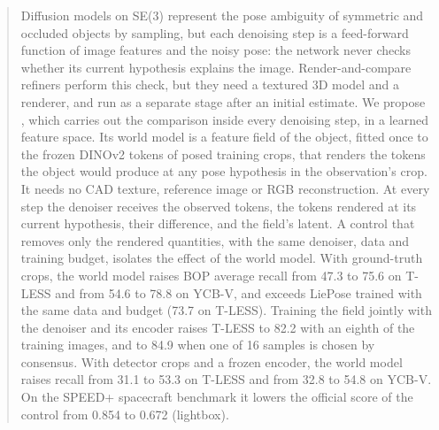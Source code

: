 \begin{abstract}
Diffusion models on SE(3) represent the pose ambiguity of symmetric and occluded objects by sampling, but each denoising step is a
feed-forward function of image features and the noisy pose: the network never checks whether its current hypothesis explains the
image. Render-and-compare refiners perform this check, but they need a textured 3D model and a renderer, and run as a separate stage
after an initial estimate. We propose \method, which carries out the comparison inside every denoising step, in a learned feature
space. Its world model is a feature field of the object, fitted once to the frozen DINOv2 tokens of posed training crops, that renders
the tokens the object would produce at any pose hypothesis in the observation's crop. It needs no CAD texture, reference image or RGB
reconstruction. At every step the denoiser receives the observed tokens, the tokens rendered at its current hypothesis, their
difference, and the field's latent. A control that removes only the rendered quantities, with the same denoiser, data and training
budget, isolates the effect of the world model. With ground-truth crops, the world model raises BOP average recall from 47.3 to 75.6
on T-LESS and from 54.6 to 78.8 on YCB-V, and \method exceeds LiePose trained with the same data and budget (73.7 on T-LESS).
Training the field jointly with the denoiser and its encoder raises T-LESS to 82.2 with an eighth of the training images, and to 84.9 when one of 16 samples is chosen by consensus. With
detector crops and a frozen encoder, the world model raises recall from 31.1 to 53.3 on T-LESS and from 32.8 to 54.8 on YCB-V. On the
SPEED+ spacecraft benchmark it lowers the official score of the control from 0.854 to 0.672 (lightbox).
\end{abstract}
